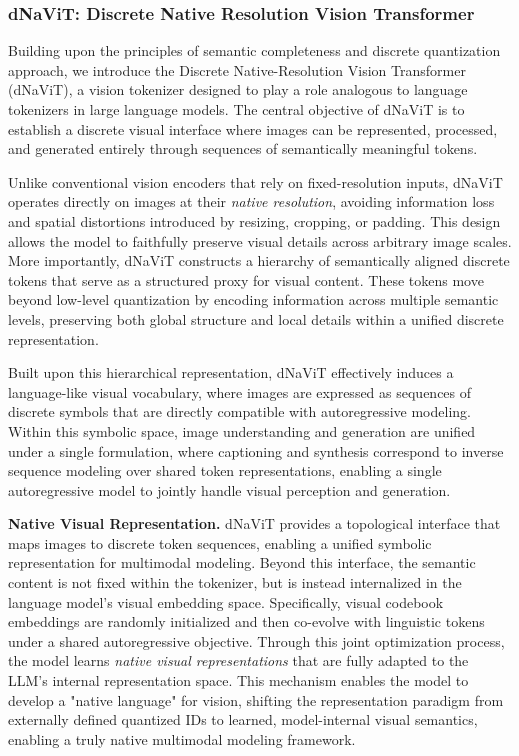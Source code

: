 \documentclass{article}
\begin{document}
\subsubsection{dNaViT: Discrete Native Resolution Vision Transformer}


Building upon the principles of semantic completeness and discrete quantization approach, we introduce the Discrete Native-Resolution Vision Transformer (dNaViT), a vision tokenizer designed to play a role analogous to language tokenizers in large language models. The central objective of dNaViT is to establish a discrete visual interface where images can be represented, processed, and generated entirely through sequences of semantically meaningful tokens.

Unlike conventional vision encoders that rely on fixed-resolution inputs, dNaViT operates directly on images at their \emph{native resolution}, avoiding information loss and spatial distortions introduced by resizing, cropping, or padding. This design allows the model to faithfully preserve visual details across arbitrary image scales.
More importantly, dNaViT constructs a hierarchy of semantically aligned discrete tokens that serve as a structured proxy for visual content. These tokens move beyond low-level quantization by encoding information across multiple semantic levels, preserving both global structure and local details within a unified discrete representation.


Built upon this hierarchical representation, dNaViT effectively induces a language-like visual vocabulary, where images are expressed as sequences of discrete symbols that are directly compatible with autoregressive modeling.
Within this symbolic space, image understanding and generation are unified under a single formulation, where captioning and synthesis correspond to inverse sequence modeling over shared token representations, enabling a single autoregressive model to jointly handle visual perception and generation.



\textbf{Native Visual Representation.} 
dNaViT provides a topological interface that maps images to discrete token sequences, enabling a unified symbolic representation for multimodal modeling. Beyond this interface, the semantic content is not fixed within the tokenizer, but is instead internalized in the language model’s visual embedding space.
Specifically, visual codebook embeddings are randomly initialized and then co-evolve with linguistic tokens under a shared autoregressive objective. Through this joint optimization process, the model learns \emph{native visual representations} that are fully adapted to the LLM’s internal representation space.
This mechanism enables the model to develop a "native language" for vision, shifting the representation paradigm from externally defined quantized IDs to learned, model-internal visual semantics, enabling a truly native multimodal modeling framework.
\end{document}

